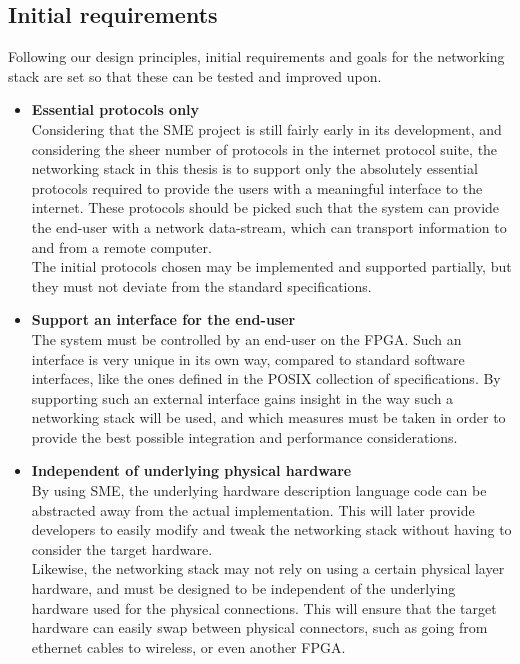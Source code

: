 \subsection{Initial requirements}
Following our design principles, initial requirements and goals for the 
networking stack are set so that these can be tested and improved upon. 
\begin{itemize}
\item \textbf{Essential protocols only}\\
Considering that the SME project is still fairly early in its development, and considering 
the sheer number of protocols in the internet protocol suite, the networking 
stack in this thesis is to support only the absolutely essential protocols 
required to provide the users with a meaningful interface to the internet.
These protocols should be picked such that the system can provide the end-user
with a network data-stream, which can transport information to and from a remote
computer.\\
The initial protocols chosen may be implemented and supported partially, but 
they must not deviate from the standard specifications. 

\item \textbf{Support an interface for the end-user}\\
The system must be controlled by an end-user on the FPGA. Such an interface is 
very unique in its own way, compared to standard software interfaces, like the 
ones defined in the POSIX collection of specifications. By supporting such an
external interface gains insight in the way such a networking stack will be used,
and which measures must be taken in order to provide the best possible integration
and performance considerations.

\item \textbf{Independent of underlying physical hardware}\\
By using SME, the underlying hardware description language code can be abstracted
away from the actual implementation. This will later provide developers to easily
modify and tweak the networking stack without having to consider the target 
hardware.\\
Likewise, the networking stack may not rely on using a certain physical layer hardware,
and must be designed to be independent of the underlying hardware used for the 
physical connections. This will ensure that the target hardware can easily 
swap between physical connectors, such as going from ethernet cables to wireless,
or even another FPGA.
\end{itemize}

